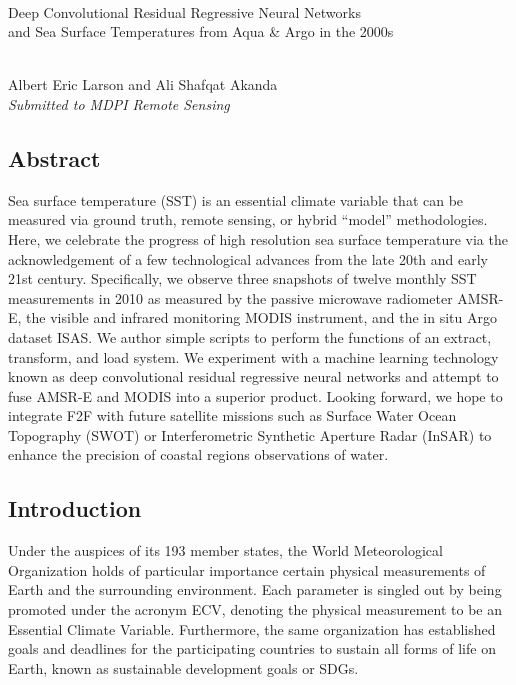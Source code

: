 




\begin{refsection}
\begin{center}
\hspace{}
\\[0.5 in]

Deep Convolutional Residual Regressive Neural Networks \\
and Sea Surface Temperatures from Aqua \& Argo in the 2000s

\\[1.0in]

Albert Eric Larson and Ali Shafqat Akanda\\[1.0in]

\emph{Submitted to MDPI Remote Sensing}
\end{center}
\newpage

\subsection{Abstract}
Sea surface temperature (SST) is an essential climate variable that can be measured via ground truth, remote sensing, or hybrid “model” methodologies. Here, we celebrate the progress of high resolution sea surface temperature via the acknowledgement of a few technological advances from the late 20th and early 21st century. Specifically, we observe three snapshots of twelve monthly SST measurements in 2010 as measured by the passive microwave radiometer AMSR-E, the visible and infrared monitoring MODIS instrument, and the in situ Argo dataset ISAS. We author simple scripts to perform the functions of an extract, transform, and load system. We experiment with a machine learning technology known as deep convolutional residual regressive neural networks and attempt to fuse AMSR-E and MODIS into a superior product. Looking forward, we hope to integrate F2F with future satellite missions such as Surface Water Ocean Topography (SWOT) or Interferometric Synthetic Aperture Radar (InSAR) to enhance the precision of coastal regions observations of water.

\subsection{Introduction}
Under the auspices of its 193 member states, the World Meteorological Organization holds of particular importance certain physical measurements of Earth and the surrounding environment. Each parameter is singled out by being promoted under the acronym ECV, denoting the physical measurement to be an Essential Climate Variable. Furthermore, the same organization has established goals and deadlines for the participating countries to sustain all forms of life on Earth, known as sustainable development goals or SDGs.


\end{refsection}

